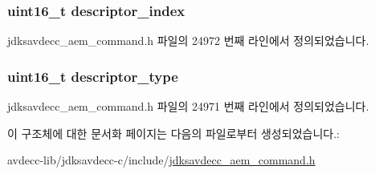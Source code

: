 \subsubsection[{\texorpdfstring{descriptor\+\_\+index}{descriptor_index}}]{\setlength{\rightskip}{0pt plus 5cm}uint16\+\_\+t descriptor\+\_\+index}\hypertarget{structjdksavdecc__aem__command__identify__notification_a042bbc76d835b82d27c1932431ee38d4}{}\label{structjdksavdecc__aem__command__identify__notification_a042bbc76d835b82d27c1932431ee38d4}


jdksavdecc\+\_\+aem\+\_\+command.\+h 파일의 24972 번째 라인에서 정의되었습니다.

\subsubsection[{\texorpdfstring{descriptor\+\_\+type}{descriptor_type}}]{\setlength{\rightskip}{0pt plus 5cm}uint16\+\_\+t descriptor\+\_\+type}\hypertarget{structjdksavdecc__aem__command__identify__notification_ab7c32b6c7131c13d4ea3b7ee2f09b78d}{}\label{structjdksavdecc__aem__command__identify__notification_ab7c32b6c7131c13d4ea3b7ee2f09b78d}


jdksavdecc\+\_\+aem\+\_\+command.\+h 파일의 24971 번째 라인에서 정의되었습니다.



이 구조체에 대한 문서화 페이지는 다음의 파일로부터 생성되었습니다.\+:\begin{DoxyCompactItemize}
\item 
avdecc-\/lib/jdksavdecc-\/c/include/\hyperlink{jdksavdecc__aem__command_8h}{jdksavdecc\+\_\+aem\+\_\+command.\+h}\end{DoxyCompactItemize}
